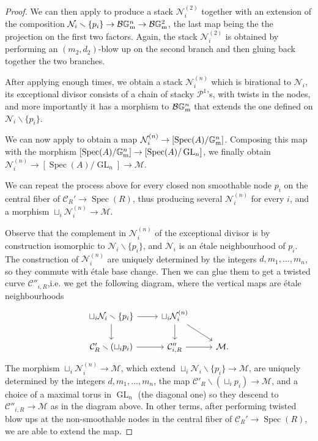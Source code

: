 \documentclass{amsart}
\newcommand{\bG}{\mathbb{G}}
\newcommand{\cB}{\mathcal{B}}
\newcommand{\cC}{\mathcal{C}}
\newcommand{\cM}{\mathcal{M}}
\newcommand{\cN}{\mathcal{N}}
\newcommand{\cP}{\mathcal{P}}
\newcommand{\spec}{\operatorname{Spec}}
\newcommand{\Gm}{\bG_{{\rm m}}}
\newcommand{\GL}{\operatorname{GL}}
\theoremstyle{definition}
\begin{document}
\begin{proof}
We can then apply  to produce a stack $\cN_i^{(2)}$ together with an extension of the composition $\cN_i\smallsetminus\{p_i\}\to \cB\Gm^n\to \cB\Gm^2$, the last map being the the projection on the first two factors. Again, the stack $\cN_i^{(2)}$ is obtained by performing an $(m_2,d_2)$-blow up on the second branch and then gluing back together the two branches.

After applying  enough times, we obtain a stack $\cN_i^{(n)}$ which is birational to $\cN_i$, its exceptional divisor consists of a chain of stacky $\cP^1$'s, with twists in the nodes, and more importantly it has a morphism to $\cB\Gm^n$ that extends the one defined on $\cN_i\smallsetminus\{p_i\}$.

We can now apply  to obtain a map $\cN_i^{(n)}\to[\spec(A)/\Gm^n]$. Composing this map with the morphism $[\spec(A)/\Gm^n]\to [\spec(A)/\GL_n]$, we finally obtain $\cN_i^{(n)} \to [\spec(A)/\GL_n] \to \cM$.

We can repeat the process above for every closed non smoothable node $p_i$ on the central fiber of $\cC_R'\to\spec(R)$, thus producing several $\cN_i^{(n)}$ for every $i$, and a morphism
 $\sqcup_{i} \cN_{i}^{(n)} \longrightarrow \cM.$

Observe that the complement in $\cN_i^{(n)}$ of the exceptional divisor is by construction isomorphic to $\cN_i\smallsetminus\{p_i\}$, and $\cN_i$ is an \'etale neighbourhood of $p_i$. The construction of $\cN_i^{(n)}$ are uniquely determined by the integers $d, m_1,...,m_n$, so they commute with \'etale base change. Then we can glue them to get a twisted curve $\cC''_{i,R}$,i.e. we get the following diagram, where the vertical maps are \'etale neighbourhoods
\[
\begin{tikzcd}
\sqcup_{i} \cN_i\smallsetminus\{p_i\} \ar[r] \ar[d] & \sqcup_{i} \cN_i^{(n)} \ar[d] \ar[dr] & \\
\cC'_R\smallsetminus (\sqcup_i p_i) \ar[r] & \cC''_{i,R}\ar[r] & \cM.
\end{tikzcd}
\]
The morphism $\sqcup_i \cN_i^{(n)}\to \cM$, which extend $\sqcup_i \cN_i\smallsetminus\{p_i\}\to\cM$, are uniquely determined by the integers $d, m_1,...,m_n$, the map $\cC'_R\smallsetminus (\sqcup_i p_i)\to \cM$, and a choice of a maximal torus in $\GL_n$ (the diagonal one) so they descend to $\cC''_{i,R}\to \cM$ as in the diagram above. In other terms, after performing twisted blow ups at the non-smoothable nodes in the central fiber of $\cC_R'\to\spec(R)$, we are able to extend the map.


\end{proof}
\end{document}
